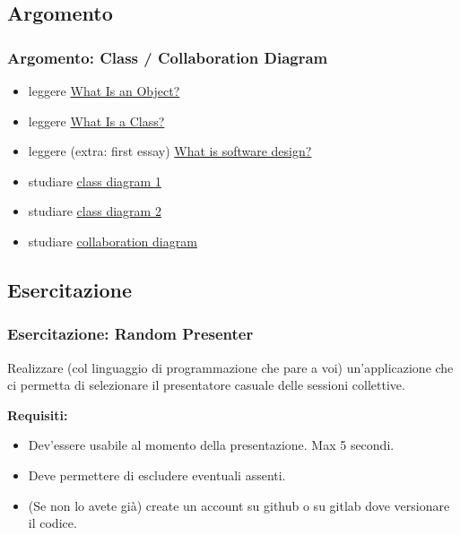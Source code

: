 \documentclass{beamer}
\begin{document}
\subsection{Argomento}
\begin{frame}
	\frametitle{Argomento: Class / Collaboration Diagram}	

	\begin{itemize}
    		\item leggere \href{http://docs.oracle.com/javase/tutorial/java/concepts/object.html}{What Is an Object?}
     		\item leggere \href{http://docs.oracle.com/javase/tutorial/java/concepts/class.html}{What Is a Class?}
     		\item leggere (extra: first essay) \href{http://www.developerdotstar.com/mag/articles/PDF/DevDotStar_Reeves_CodeAsDesign.pdf}{What is software design?}
    		\item studiare \href{http://www.hristov.com/andrey/tu-sofia/uml/umlClassDiagrams.pdf}{class diagram 1}
    		\item studiare \href{http://www.ibm.com/developerworks/rational/library/content/RationalEdge/sep04/bell/index.html}{class diagram 2}
    		\item studiare \href{http://www.csee.wvu.edu/~ammar/rts/adv\%20rts/UML\%20tutorials/uml\%20diagrams/umlCollaborationDiagrams.pdf}{collaboration diagram}
	\end{itemize}
\end{frame}

\subsection{Esercitazione}
\begin{frame}
\frametitle{Esercitazione: Random Presenter}	

Realizzare (col linguaggio di programmazione che pare a voi) un'applicazione che ci permetta di selezionare il presentatore casuale delle sessioni collettive.

\textbf{Requisiti:}
\begin{itemize}
	\item Dev'essere usabile al momento della presentazione. Max 5 secondi.
	\item Deve permettere di escludere eventuali assenti. 
	\item (Se non lo avete già) create un account su github o su gitlab dove versionare il codice.
\end{itemize}
\end{frame}
\end{document}
